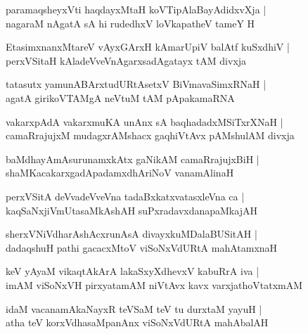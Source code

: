 \begin{shloka}
paramaqsheyxVti haqdayxMtaH koVTipAlaBayAdidxvXja |\\
nagaraM nAgatA sA hi rudedhxV loVkapatheV tameY H
\end{shloka}

\begin{shloka}
EtasimxnanxMtareV vAyxGArxH kAmarUpiV balAtf kuSxdhiV |\\
perxVSitaH kAladeVveVnAgarxsadAgatayx tAM divxja
\end{shloka}

\begin{shloka}
tatasutx yamunABArxtudURtAsetxV BiVmavaSimxRNaH |\\
agatA girikoVTAMgA neVtuM tAM pApakamaRNA
\end{shloka}

\begin{shloka}
vakarxpAdA vakarxmuKA unAnx sA baqhadadxMSiTxrXNaH |\\
camaRrajujxM mudagxrAMshacx gaqhiVtAvx pAMshulAM divxja
\end{shloka}

\begin{shloka}
baMdhayAmAsurunamxkAtx gaNikAM camaRrajujxBiH |\\
shaMKacakarxgadApadamxdhAriNoV vanamAlinaH 
\end{shloka}

\begin{shloka}
perxVSitA deVvadeVveVna tadaBxkatxvatasxleVna ca |\\
kaqSaNxjiVmUtasaMkAshAH suPxradavxdanapaMkajAH
\end{shloka}

\begin{shloka}
sherxVNiVdharAshAcxrunAsA divayxkuMDalaBUSitAH |\\
dadaqshuH pathi gacacxMtoV viSoNxVdURtA mahAtamxnaH 
\end{shloka}

\begin{shloka}
keV yAyaM vikaqtAkArA lakaSxyXdhevxV kabuRrA iva |\\
imAM viSoNxVH pirxyatamAM niVtAvx kavx varxjathoVtatxmAM
\end{shloka}

\begin{shloka}
idaM vacanamAkaNayxR teVSaM teV tu durxtaM yayuH |\\
atha teV korxVdhasaMpanAnx viSoNxVdURtA mahAbalAH 
\end{shloka}

